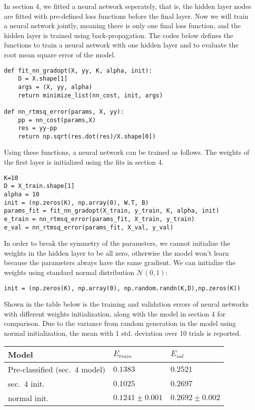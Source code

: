 \documentclass[11pt]{article}
\begin{document}
In section 4, we fitted a neural network seperately, that is, the hidden
layer nodes are fitted with pre-defined loss functions before the final
layer. Now we will train a neural network jointly, meaning there is only
one final loss function, and the hidden layer is trained using
back-propagation. The codes below defines the functions to train a
neural network with one hidden layer and to evaluate the root mean
square error of the model.

\begin{verbatim}
def fit_nn_gradopt(X, yy, K, alpha, init):
    D = X.shape[1]
    args = (X, yy, alpha)
    return minimize_list(nn_cost, init, args)

def nn_rtmsq_error(params, X, yy):
    pp = nn_cost(params,X)
    res = yy-pp
    return np.sqrt(res.dot(res)/X.shape[0])
\end{verbatim}

Using these functions, a neural network can be trained as follows. The
weights of the first layer is initialized using the fits in section 4.

\begin{verbatim}
K=10
D = X_train.shape[1]
alpha = 10
init = (np.zeros(K), np.array(0), W.T, B)
params_fit = fit_nn_gradopt(X_train, y_train, K, alpha, init)
e_train = nn_rtmsq_error(params_fit, X_train, y_train)
e_val = nn_rtmsq_error(params_fit, X_val, y_val)
\end{verbatim}

In order to break the symmetry of the parameters, we cannot initialize
the weights in the hidden layer to be all zero, otherwise the model
won't learn because the parameters always have the same gradient. We can
initialize the weights using standard normal distribution
\(\mathcal{N}(0,1)\):

\begin{verbatim}
init = (np.zeros(K), np.array(0), np.random.randn(K,D),np.zeros(K))
\end{verbatim}

Shown in the table below is the training and validation errors of neural
networks with different weights initialization, along with the model in
section 4 for comparison. Due to the variance from random generation in
the model using normal initialization, the mean with 1 std. deviation
over 10 trials is reported.

\begin{longtable}[]{@{}lll@{}}
\toprule
Model & \(E_{train}\) & \(E_{val}\)\tabularnewline
\midrule
\endhead
Pre-classified (sec.~4 model) & \(0.1383\) & \(0.2521\)\tabularnewline
sec.~4 init. & \(0.1025\) & \(0.2697\)\tabularnewline
normal init. & \(0.1241\pm0.001\) & \(0.2692\pm0.002\)\tabularnewline
\bottomrule
\end{longtable}
\end{document}
